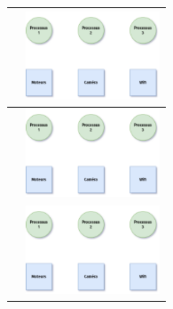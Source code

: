 \documentclass[12pt,a4paper,article,english,firamath]{nsi}
\newcommand{\truc}{4cm}
\begin{document}
\begin{center}
\begin{tabular}{|c|c|}
        \hline
                                                                 & \includegraphics[width=\truc]{img/d6.png}                \\
        \hline
                                                                 & \includegraphics[width=\truc]{img/d6.png}                \\
        \hline
                                                                 & \includegraphics[width=\truc]{img/d6.png}                \\

\end{tabular}
\end{center}
\end{document}
